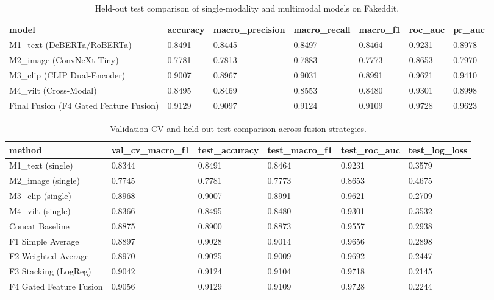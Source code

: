 \begin{table}[t]
\centering
\caption{Held-out test comparison of single-modality and multimodal models on Fakeddit.}
\label{tab:e1_results}
\begin{tabular}{lllllll}
\toprule
model & accuracy & macro\_precision & macro\_recall & macro\_f1 & roc\_auc & pr\_auc \\
\midrule
M1\_text (DeBERTa/RoBERTa) & 0.8491 & 0.8445 & 0.8497 & 0.8464 & 0.9231 & 0.8978 \\
M2\_image (ConvNeXt-Tiny) & 0.7781 & 0.7813 & 0.7883 & 0.7773 & 0.8653 & 0.7970 \\
M3\_clip (CLIP Dual-Encoder) & 0.9007 & 0.8967 & 0.9031 & 0.8991 & 0.9621 & 0.9410 \\
M4\_vilt (Cross-Modal) & 0.8495 & 0.8469 & 0.8553 & 0.8480 & 0.9301 & 0.8998 \\
Final Fusion (F4 Gated Feature Fusion) & 0.9129 & 0.9097 & 0.9124 & 0.9109 & 0.9728 & 0.9623 \\
\bottomrule
\end{tabular}
\end{table}

\begin{table}[t]
\centering
\caption{Validation CV and held-out test comparison across fusion strategies.}
\label{tab:e2_fusion}
\begin{tabular}{llllll}
\toprule
method & val\_cv\_macro\_f1 & test\_accuracy & test\_macro\_f1 & test\_roc\_auc & test\_log\_loss \\
\midrule
M1\_text (single) & 0.8344 & 0.8491 & 0.8464 & 0.9231 & 0.3579 \\
M2\_image (single) & 0.7745 & 0.7781 & 0.7773 & 0.8653 & 0.4675 \\
M3\_clip (single) & 0.8968 & 0.9007 & 0.8991 & 0.9621 & 0.2709 \\
M4\_vilt (single) & 0.8366 & 0.8495 & 0.8480 & 0.9301 & 0.3532 \\
Concat Baseline & 0.8875 & 0.8900 & 0.8873 & 0.9557 & 0.2938 \\
F1 Simple Average & 0.8897 & 0.9028 & 0.9014 & 0.9656 & 0.2898 \\
F2 Weighted Average & 0.8970 & 0.9025 & 0.9009 & 0.9692 & 0.2447 \\
F3 Stacking (LogReg) & 0.9042 & 0.9124 & 0.9104 & 0.9718 & 0.2145 \\
F4 Gated Feature Fusion & 0.9056 & 0.9129 & 0.9109 & 0.9728 & 0.2244 \\
\bottomrule
\end{tabular}
\end{table}

